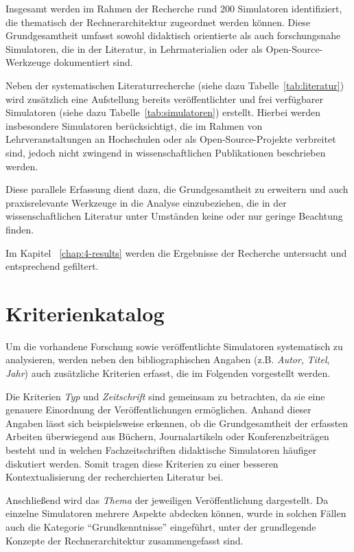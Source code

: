 Insgesamt werden im Rahmen der Recherche rund 200 Simulatoren identifiziert, die thematisch der Rechnerarchitektur zugeordnet werden können. Diese Grundgesamtheit umfasst sowohl didaktisch orientierte als auch forschungsnahe Simulatoren, die in der Literatur, in Lehrmaterialien oder als Open-Source-Werkzeuge dokumentiert sind.

Neben der systematischen Literaturrecherche (siehe dazu Tabelle~\ref{tab:literatur}) wird zusätzlich eine Aufstellung bereits veröffentlichter und frei verfügbarer Simulatoren (siehe dazu Tabelle~\ref{tab:simulatoren}) erstellt. Hierbei werden insbesondere Simulatoren berücksichtigt, die im Rahmen von Lehrveranstaltungen an Hochschulen oder als Open-Source-Projekte verbreitet sind, jedoch nicht zwingend in wissenschaftlichen Publikationen beschrieben werden.

Diese parallele Erfassung dient dazu, die Grundgesamtheit zu erweitern und auch praxisrelevante Werkzeuge in die Analyse einzubeziehen, die in der wissenschaftlichen Literatur unter Umständen keine oder nur geringe Beachtung finden.

Im Kapitel ~\ref{chap:4-results} werden die Ergebnisse der Recherche untersucht und entsprechend gefiltert.

\section{Kriterienkatalog}\label{chap:kriterienkatalog}

Um die vorhandene Forschung sowie veröffentlichte Simulatoren systematisch zu analysieren, werden neben den bibliographischen Angaben (z.B. \textit{Autor}, \textit{Titel}, \textit{Jahr}) auch zusätzliche Kriterien erfasst, die im Folgenden vorgestellt werden.

Die Kriterien \textit{Typ} und \textit{Zeitschrift} sind gemeinsam zu betrachten, da sie eine genauere Einordnung der Veröffentlichungen ermöglichen. Anhand dieser Angaben lässt sich beispielsweise erkennen, ob die Grundgesamtheit der erfassten Arbeiten überwiegend aus Büchern, Journalartikeln oder Konferenzbeiträgen besteht und in welchen Fachzeitschriften didaktische Simulatoren häufiger diskutiert werden. Somit tragen diese Kriterien zu einer besseren Kontextualisierung der recherchierten Literatur bei.

Anschließend wird das \textit{Thema} der jeweiligen Veröffentlichung dargestellt. Da einzelne Simulatoren mehrere Aspekte abdecken können, wurde in solchen Fällen auch die Kategorie \enquote{Grundkenntnisse} eingeführt, unter der grundlegende Konzepte der Rechnerarchitektur zusammengefasst sind.

